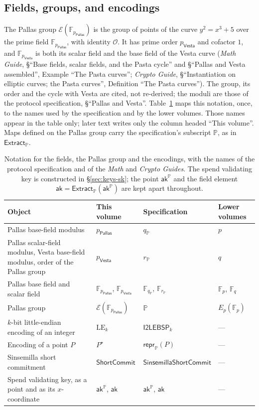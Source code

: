 \documentclass[11pt,a4paper]{article}
\theoremstyle{definition}
\newcommand{\F}{\mathbb{F}}
\newcommand{\PP}{\mathbb{P}}
\newcommand{\Pallas}{\ensuremath{\mathsf{Pallas}}}
\newcommand{\Vesta}{\ensuremath{\mathsf{Vesta}}}
\newcommand{\Ep}{\ensuremath{\mathcal{E}}}
\newcommand{\ShortCommit}{\ensuremath{\mathsf{ShortCommit}}}
\newcommand{\Extract}{\ensuremath{\mathsf{Extract}}}
\newcommand{\aksym}{\ensuremath{\mathsf{ak}}}
\begin{document}
\subsection{Fields, groups, and encodings}\label{sec:prim-fields}

The Pallas group $\Ep(\F_{p_{\Pallas}})$ is the group of points of the curve
$y^2 = x^3 + 5$ over the prime field $\F_{p_{\Pallas}}$, with identity
$\mathcal{O}$. It has prime order $p_{\Vesta}$ and cofactor $1$, and
$\F_{p_{\Vesta}}$ is both its scalar field and the base field of the Vesta
curve (\emph{Math Guide}, \S``Base fields, scalar fields, and the Pasta
cycle'' and \S``Pallas and Vesta assembled'', Example ``The Pasta curves'';
\emph{Crypto Guide}, \S``Instantiation on elliptic curves; the Pasta curves'',
Definition ``The Pasta curves''). The group, its order and the cycle with
Vesta are cited, not re-derived; the moduli are those of the protocol
specification, \S``Pallas and Vesta''. Table~\ref{tab:prim-notation} maps
this notation, once, to the names used by the specification and by the lower
volumes. Those names appear in the table only; later text writes only the
column headed ``This volume''. Maps defined on the Pallas group carry the
specification's subscript $\PP$, as in $\Extract_{\PP}$.

\begin{table}[ht]
\centering\small
\begin{tabular}{@{}p{5.3cm}lll@{}}
\toprule
Object & This volume & Specification & Lower volumes \\
\midrule
Pallas base-field modulus
  & $p_{\Pallas}$ & $q_{\mathbb{P}}$ & $p$ \\
Pallas scalar-field modulus, Vesta base-field modulus, order of the Pallas
group
  & $p_{\Vesta}$ & $r_{\mathbb{P}}$ & $q$ \\
Pallas base field and scalar field
  & $\F_{p_{\Pallas}}$, $\F_{p_{\Vesta}}$
  & $\F_{q_{\mathbb{P}}}$, $\F_{r_{\mathbb{P}}}$ & $\F_p$, $\F_q$ \\
Pallas group
  & $\Ep(\F_{p_{\Pallas}})$ & $\mathbb{P}$ & $E_p(\F_p)$ \\
$k$-bit little-endian encoding of an integer
  & $\mathrm{LE}_k$ & $\mathsf{I2LE{}BSP}_k$ & --- \\
Encoding of a point $P$
  & $P^{\star}$ & $\mathsf{repr}_{\mathbb{P}}(P)$ & --- \\
Sinsemilla short commitment
  & $\ShortCommit$ & $\mathsf{Sinsemilla{}ShortCommit}$ & --- \\
Spend validating key, as a point and as its $x$-coordinate
  & $\aksym^{\PP}$, $\aksym$ & $\aksym^{\mathbb{P}}$, $\aksym$ & --- \\
\bottomrule
\end{tabular}
\caption{Notation for the fields, the Pallas group and the encodings, with
the names of the protocol specification and of the \emph{Math} and
\emph{Crypto Guides}. The spend validating key is constructed in
\S\ref{sec:keys-sk}; the point $\aksym^{\PP}$ and the field element
$\aksym = \Extract_{\PP}(\aksym^{\PP})$ are kept apart throughout.}
\label{tab:prim-notation}
\end{table}
\end{document}
